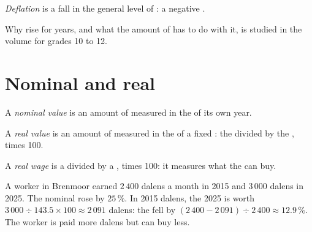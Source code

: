 \begin{definition}[Deflation]\label{def:g8:inflation-and-price-indices:deflation}
\emph{Deflation} is a fall in the general level of : a negative
.
\end{definition}

Why  rise for years, and what the amount of  has to do with it, is studied in the
volume for grades 10 to 12.

\section{Nominal and real}

\begin{definition}\label{def:g8:inflation-and-price-indices:nominal}
A \emph{nominal value} is an amount of  measured in the  of its
own year.
\end{definition}

\begin{definition}\label{def:g8:inflation-and-price-indices:real}
A \emph{real value} is an amount of  measured in the  of a fixed
: the  divided by the , times 100.
\end{definition}

\begin{definition}\label{def:g8:inflation-and-price-indices:real-wage}
A \emph{real wage} is a  divided by a , times 100: it
measures what the  can buy.
\end{definition}

\begin{example}
A worker in Brenmoor earned $2\,400$ dalens a month in 2015 and $3\,000$ dalens in 2025. The
nominal  rose by $25\,\%$. In 2015 dalens, the 2025  is worth $3\,000 \div 143.5 \times 100
\approx 2\,091$ dalens: the  fell by $(2\,400 - 2\,091) \div 2\,400 \approx 12.9\,\%$. The
worker is paid more dalens but can buy less.
\end{example}

